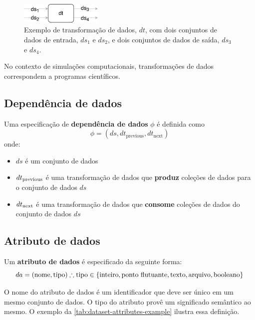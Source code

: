 \begin{figure}[ht]
    \centering
    \includegraphics[width=0.35\textwidth]{img/example-data-transformation}
    \caption[Exemplo de transformação de dados]{Exemplo de transformação de dados, \( dt \), com dois conjuntos de dados de entrada, \( ds_1 \) e \( ds_2 \), e dois conjuntos de dados de saída, \( ds_3 \) e \( ds_4 \).}%
    \label{fig:example-transformation}
\end{figure}

No contexto de simulações computacionais, transformações de dados correspondem a programas científicos.

\subsection{Dependência de dados}

Uma especificação de \textbf{dependência de dados} \( \phi \) é definida como \[ \phi = (ds, dt_{\textrm{previous}}, dt_{\textrm{next}}) \] onde:
\begin{itemize}
    \item \( ds \) é um conjunto de dados
    \item \( dt_{\textup{previous}} \) é uma transformação de dados que {\bf produz} coleções de dados para o conjunto de dados \( ds \)
    \item \( dt_{\textup{next}} \) é uma transformação de dados que {\bf consome} coleções de dados do conjunto de dados \( ds \)
\end{itemize}

\subsection{Atributo de dados}

Um \textbf{atributo de dados} é especificado da seguinte forma: \[ da = (\textrm{nome},\textrm{tipo}) \therefore \textrm{tipo} \in \{\textup{inteiro}, \textup{ponto flutuante}, \textup{texto}, \textup{arquivo}, \textup{booleano}\} \]

O nome do atributo de dados é um identificador que deve ser único em um mesmo conjunto de dados. O tipo do atributo provê um significado semântico ao mesmo. O exemplo da \autoref{tab:dataset-attributes-example} ilustra essa definição.

